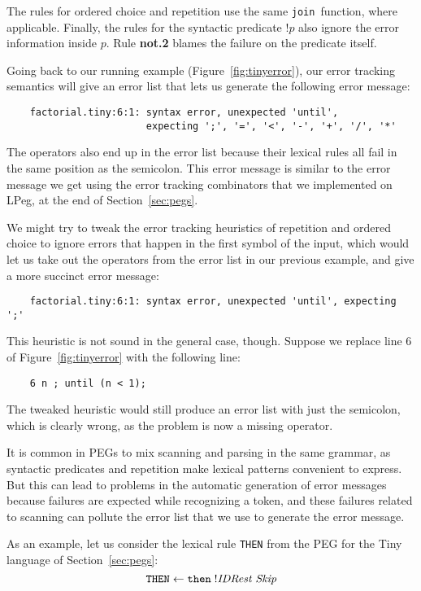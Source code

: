 \documentclass[3p,12pt,singlecolumn]{elsarticle}
\newcommand{\J}{{\tt join}}
\begin{document}
The rules for ordered choice and repetition use the
same \J\ function, where applicable. Finally, the rules
for the syntactic predicate $!p$ also ignore the error
information inside $p$. Rule {\bf not.2} blames the
failure on the predicate itself.

Going back to our running example (Figure~\ref{fig:tinyerror}),
our error tracking semantics will give an error list that
lets us generate the following error message:
\begin{verbatim}
    factorial.tiny:6:1: syntax error, unexpected 'until',
                        expecting ';', '=', '<', '-', '+', '/', '*'
\end{verbatim}

The operators also end up in the error list because
their lexical rules all fail in the same position as
the semicolon. This error message is similar to the
error message we get using the error tracking
combinators that we implemented on LPeg, at the end of
Section~\ref{sec:pegs}.

We might try to tweak the error tracking heuristics of
repetition and ordered choice to ignore errors that happen
in the first symbol of the input, which would let us
take out the operators from the error list in our previous
example, and give a more succinct error message:
\begin{verbatim}
    factorial.tiny:6:1: syntax error, unexpected 'until', expecting ';'
\end{verbatim}

This heuristic is not sound in the general case, though.
Suppose we replace line 6 of Figure~\ref{fig:tinyerror}
with the following line:
\begin{verbatim}
    6 n ; until (n < 1);
\end{verbatim}

The tweaked heuristic would still produce an error list
with just the semicolon, which is clearly wrong, as the
problem is now a missing operator.

It is common in PEGs to mix scanning and parsing in the
same grammar, as syntactic predicates and repetition make
lexical patterns convenient to express. But this can lead
to problems in the automatic generation of error messages
because failures are expected while recognizing a token,
and these failures related to scanning can pollute the
error list that we use to generate the error message.
 
As an example, let us consider the lexical rule {\tt THEN}
from the PEG for the Tiny language of Section~\ref{sec:pegs}:
\[
  {\tt THEN} \leftarrow {\tt then} \; \it{!IDRest \; Skip}
\]
\end{document}
